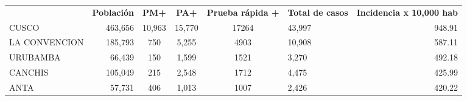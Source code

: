 \begin{tabular}{lrccclr}
	\rowcolor[HTML]{DCE6F1} 
	\multicolumn{1}{c}{\cellcolor[HTML]{DCE6F1}\textbf{PROVINCIA}} & \multicolumn{1}{c}{\cellcolor[HTML]{DCE6F1}\textbf{Población}} & \textbf{PM+}                                                & \textbf{PA+}         & \textbf{Prueba rápida +} & \multicolumn{1}{c}{\cellcolor[HTML]{DCE6F1}\textbf{Total de casos}} & \multicolumn{1}{c}{\cellcolor[HTML]{DCE6F1}\textbf{Incidencia x 10,000 hab}} \\
	\cellcolor[HTML]{FF5050}CUSCO                                  & 463,656                                                        & 10,963                                                      & 15,770               & 17264                    & 43,997                                                              & 948.91                                                                       \\
	\cellcolor[HTML]{F4B084}LA   CONVENCION                        & 185,793                                                        & 750                                                         & 5,255                & 4903                     & 10,908                                                              & 587.11                                                                       \\
	\cellcolor[HTML]{F4B084}URUBAMBA                               & 66,439                                                         & 150                                                         & 1,599                & 1521                     & 3,270                                                               & 492.18                                                                       \\
	\cellcolor[HTML]{FFE699}CANCHIS                                & 105,049                                                        & 215                                                         & 2,548                & 1712                     & 4,475                                                               & 425.99                                                                       \\
	\cellcolor[HTML]{FFE699}ANTA                                   & 57,731                                                         & 406                                                         & 1,013                & 1007                     & 2,426                                                               & 420.22                                                                       \\

\end{tabular}
